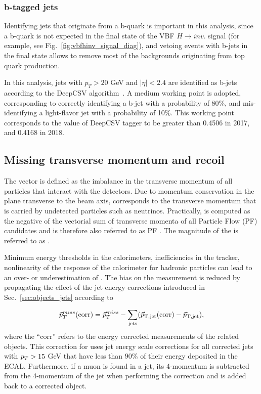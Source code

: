 \subsubsection{b-tagged jets}
\label{subsec:objects_bjets}

Identifying jets that originate from a b-quark is important in this analysis, since a b-quark is not expected in the
final state of the VBF $H \rightarrow inv.$ signal (for example, see Fig.~\ref{fig:vbfhinv_signal_diag}), 
and vetoing events with b-jets in the final state allows to remove most of the 
backgrounds originating from top quark production.

In this analysis, jets with $p_{T} > 20$ GeV and $|\eta| < 2.4$ are identified as b-jets according to the
DeepCSV algorithm~\cite{Sirunyan:2017ezt}. A medium working point is adopted, corresponding to correctly identifying a b-jet with a
probability of 80\%, and mis-identifying a light-flavor jet with a probability of 10\%. This working point corresponds to the value of 
DeepCSV tagger to be greater than 0.4506 in 2017, and 0.4168 in 2018.

\subsection{Missing transverse momentum and recoil}
\label{subsec:objects_met_recoil}

The vector \ptvecmiss is defined as the imbalance in the transverse
momentum of all particles that interact with the detectors.
Due to momentum conservation in the plane transverse to the beam axis, \ptvecmiss
corresponds to the transverse momentum that is carried by undetected particles such as neutrinos.
Practically, \ptvecmiss is computed as the negative of the vectorial sum of transverse
momenta of all Particle Flow (PF) candidates and is therefore also referred to as PF \ptvecmiss. 
The magnitude of the \ptvecmiss is referred to as \ptmiss.

Minimum energy thresholds in the calorimeters, inefficiencies
in the tracker, nonlinearity of the response of the calorimeter
for hadronic particles can lead to an over- or underestimation of \ptmiss.
The bias on the \ptmiss measurement is reduced by propagating the effect of the jet energy
corrections introduced in Sec.~\ref{sec:objects_jets} according to

\begin{equation}
\vec{p}_{T}^{miss}(\mathrm{corr})
=\vec{p}_{T}^{miss} - \sum_\mathrm{jets} (\vec{p}_\mathrm{T,jet}({\mathrm{corr}})-\vec{p}_\mathrm{T,jet}),
\label{eq:Type1MET}
\end{equation}
where the ``corr'' refers to the energy corrected measurements
of the related objects.
This correction for \ptvecmiss uses jet energy scale corrections
for all corrected jets with $p_T > 15$ GeV that have less than $90 \%$
of their energy deposited in the ECAL. Furthermore, if a muon is found in a
jet, its 4-momentum is subtracted from the 4-momentum of the jet
when performing the correction and is added back to a corrected object.

